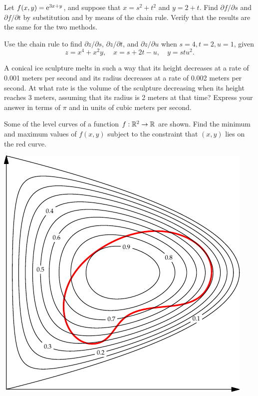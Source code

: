 \documentclass{watsonbook}
\begin{document}

\begin{aexercise}
  Let $f(x,y)=\operatorname{e}^{3x+y}$, and suppose that $x=s^2+t^2$ and $y=2+t$. Find $\partial f/\partial s$ and $\partial f/\partial t$ by substitution and by means of the chain rule. Verify that the results are the same for the two methods. 
\end{aexercise}


\begin{aexercise}
  Use the chain rule to find $\partial z/\partial s$, $\partial
  z/\partial t$, and $\partial z/\partial u$ when $s=4, t = 2, u=1$, given 
  \[
    z = x^4 + x^2y, \quad x = s + 2t - u, \quad y = stu^2.
  \]
\end{aexercise}

\begin{aexercise}
  A conical ice sculpture melts in such a way that its height decreases at a rate of 0.001 meters per second and its radius decreases at a rate of 0.002 meters per second. At what rate is the volume of the sculpture decreasing when its height reaches 3 meters, assuming that its radius is 2 meters at that time? Express your answer in terms of $\pi$ and  in units of cubic meters per second. 
\end{aexercise}


\begin{aexercise}
  Some of the level curves of a function $f: \mathbb{R}^2 \to \mathbb{R}$ are
  shown. Find the minimum and maximum values of $f(x,y)$ subject to
  the constraint that $(x,y)$ lies on the red curve.
  \begin{center}
    \includegraphics{exercisefigures/lagrange_exercise} 
  \end{center}
\end{aexercise}
\end{document}
